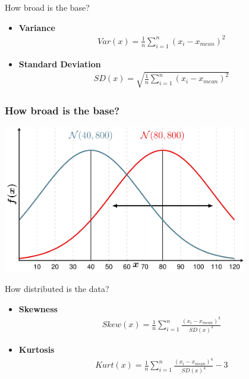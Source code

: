 \documentclass{beamer}
\begin{document}
    \begin{frame}{How broad is the base?}
        \begin{itemize}
            \item \textbf{Variance}
            \begin{align*}
                Var(x) = \frac{1}{n}\sum_{i=1}^{n}(x_{i}-x_{mean})^{2}
            \end{align*}
            \item \textbf{Standard Deviation}
            \begin{align*}
                SD(x) = \sqrt{\frac{1}{n}\sum_{i=1}^{n}(x_{i}-x_{mean})^{2}}
            \end{align*}
        \end{itemize}
    \end{frame}
    \begin{frame}
        \frametitle{How broad is the base?}
        \begin{center}
            \includegraphics[width=0.8\textwidth]{figures/Variance.png}
        \end{center}
    \end{frame}

    \begin{frame}{How distributed is the data?}
        \begin{itemize}
            \item \textbf{Skewness}
            \begin{align*}
                Skew(x) = \frac{1}{n}\sum_{i=1}^{n}\frac{(x_{i}-x_{mean})^{3}}{SD(x)^{3}}
            \end{align*}
            \item \textbf{Kurtosis}
            \begin{align*}
                Kurt(x) = \frac{1}{n}\sum_{i=1}^{n}\frac{(x_{i}-x_{mean})^{4}}{SD(x)^{4}} - 3
            \end{align*}
        \end{itemize}
    \end{frame}
\end{document}
